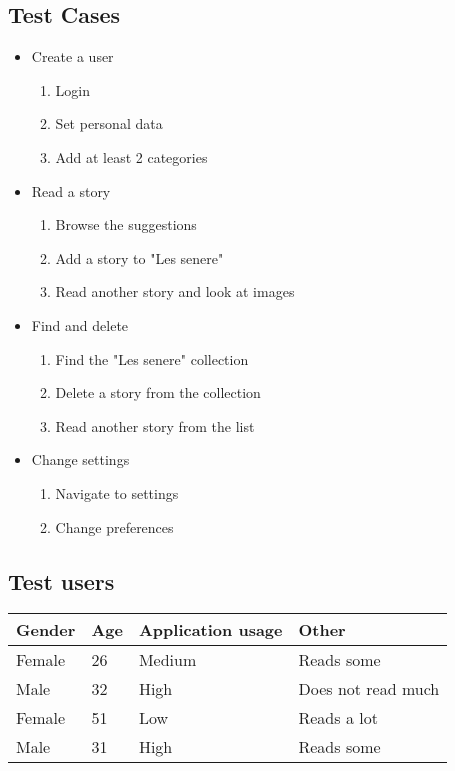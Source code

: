 \subsection{Test Cases}

\begin{itemize}
	\item Create a user 	
	\begin{enumerate}
		\item Login 
		\item Set personal data 
		\item Add at least 2 categories 
	\end{enumerate}
	\item Read a story 
	\begin{enumerate}
		\item Browse the suggestions 
		\item Add a story to "Les senere" 
		\item Read another story and look at images 
	\end{enumerate}
	\item Find and delete 
	\begin{enumerate}
		\item Find the "Les senere" collection
		\item Delete a story from the collection
		\item Read another story from the list 
	\end{enumerate}
	\item Change settings 
	\begin{enumerate}
		\item Navigate to settings 
		\item Change preferences 
	\end{enumerate}
	
\end{itemize}

\subsection{Test users}

\begin{table}[H]
	\begin{center}
		\begin{tabular}{ | l | l | l | l |}
			\hline
			\textbf{Gender} & \textbf{Age} & \textbf{Application usage} & \textbf{Other} \\ \hline
			Female & 26 & Medium & Reads some \\\hline
			Male & 32 & High & Does not read much \\\hline
			Female & 51 & Low & Reads a lot \\\hline
			Male & 31 & High & Reads some \\\hline 
			
		\end{tabular}
	\end{center}
\end{table}

